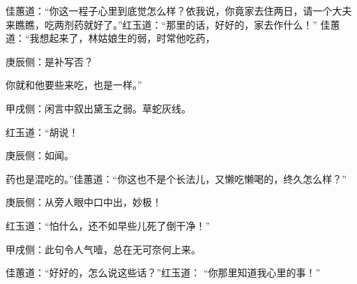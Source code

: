 \begin{parag}
    佳蕙道：“你这一程子心里到底觉怎么样？依我说，你竟家去住两日，请一个大夫来瞧瞧，吃两剂药就好了。”红玉道：“那里的话，好好的，家去作什么！” 佳蕙道：“我想起来了，林姑娘生的弱，时常他吃药，\begin{note}庚辰侧：是补写否？\end{note}你就和他要些来吃，也是一样。”\begin{note}甲戌侧：闲言中叙出黛玉之弱。草蛇灰线。\end{note}红玉道：“胡说！\begin{note}庚辰侧：如闻。\end{note}药也是混吃的。”佳蕙道：“你这也不是个长法儿，又懒吃懒喝的，终久怎么样？”\begin{note}庚辰侧：从旁人眼中口中出，妙极！\end{note}红玉道：“怕什么，还不如早些儿死了倒干净！”\begin{note}甲戌侧：此句令人气噎，总在无可奈何上来。\end{note}佳蕙道：“好好的，怎么说这些话？”红玉道： “你那里知道我心里的事！”
\end{parag}


